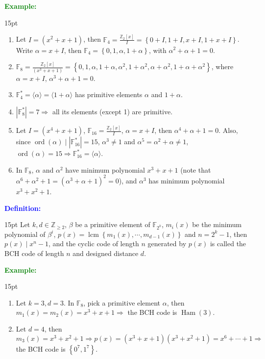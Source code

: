 \documentclass[12pt]{article}
\newcommand{\noparskip}{\vspace{-\parskip}}
\newenvironment{points}
	{\begin{enumerate}[label = (\arabic*)]}
	{\end{enumerate}}
\newenvironment{dent}
	{\begin{adjustwidth}{15pt}{}\noparskip}
	{\end{adjustwidth}}
\newenvironment{definition}
	{\textcolor{Blue}{\textbf{Definition:}}\begin{dent}}
	{\end{dent}}
\newenvironment{example}
	{\textcolor{Green}{\textbf{Example:}}\begin{dent}}
	{\end{dent}}
\renewcommand{\implies}{\Rightarrow}
\newcommand{\set}[1]{\left\{ #1 \right\}}
\newcommand{\sizeof}[1]{\left| #1 \right|}
\newcommand{\Z}{\mathbb{Z}}
\newcommand{\Ztwox}{\Z_2[x]}
\newcommand{\Ztwoxover}[1]{\frac{\Ztwox}{#1}}
\newcommand{\gen}[1]{\left( #1 \right)}
\newcommand{\Ztwoxgen}[1]{\frac{\Ztwox}{\gen{#1}}}
\newcommand{\field}[1]{\mathbb{F}_{#1}}
\newcommand{\cycgen}[1]{\langle #1 \rangle}
\newcommand{\Ham}[1]{\operatorname{Ham}(#1)}
\newcommand{\ord}[1]{\operatorname{ord}(#1)}
\newcommand{\lcm}[1]{\operatorname{lcm}\set{#1}}
\begin{document}
\begin{example}
\begin{points}
\item Let $I = \gen{x^2 + x + 1}$, then $\field{4} = \Ztwoxover{I} = \set{0 + I, 1 + I, x + I, 1 + x + I}$. Write $\alpha = x + I$, then $\field{4} = \set{0, 1, \alpha, 1 + \alpha}$, with $\alpha^2 + \alpha + 1 = 0$.
\item $\field{8} = \Ztwoxgen{x^3 + x + 1} = \set{0, 1, \alpha, 1 + \alpha, \alpha^2, 1 + \alpha^2, \alpha + \alpha^2, 1 + \alpha + \alpha^2}$, where $\alpha = x + I$, $\alpha^3 + \alpha + 1 = 0$.
\item $\field{4}^* = \cycgen{\alpha} = \cycgen{1 + \alpha}$ has primitive elements $\alpha$ and $1 + \alpha$.
\item $\sizeof{\field{8}^*} = 7 \implies$ all its elements (except 1) are primitive.
\item Let $I = \gen{x^4 + x + 1}$, $\field{16} = \Ztwoxover{I}$, $\alpha = x + I$, then $\alpha^4 + \alpha + 1 = 0$. Also, since $\ord{\alpha} \mid \sizeof{\field{16}^*} = 15$, $\alpha^3 \ne 1$ and $\alpha^5 = \alpha^2 + \alpha \ne 1$, $\ord{\alpha} = 15 \implies \field{16}^* = \cycgen{\alpha}$.
\item In $\field{8}$, $\alpha$ and $\alpha^2$ have minimum polynomial $x^3 + x + 1$ (note that $\alpha^6 + \alpha^2 + 1 = (\alpha^3 + \alpha + 1)^2 = 0$), and $\alpha^3$ has minimum polynomial $x^3 + x^2 + 1$.
\end{points}
\end{example}

\begin{definition}
Let $k, d \in \Z_{\ge 2}$, $\beta$ be a primitive element of $\field{2^k}$, $m_i(x)$ be the minimum polynomial of $\beta^i$, $p(x) = \lcm{m_1(x), \cdots, m_{d - 1}(x)}$ and $n = 2^k - 1$, then $p(x) \mid x^n - 1$, and the cyclic code of length $n$ generated by $p(x)$ is called the BCH code of length $n$ and designed distance $d$.
\end{definition}

\begin{example}
\begin{points}
\item Let $k = 3, d = 3$. In $\field{8}$, pick a primitive element $\alpha$, then $m_1(x) = m_2(x) = x^3 + x + 1 \implies$ the BCH code is $\Ham{3}$.
\item Let $d = 4$, then $m_3(x) = x^3 + x^2 + 1 \implies p(x) = (x^3 + x + 1)(x^3 + x^2 + 1) = x^6 + \cdots + 1 \implies$ the BCH code is $\set{0^7, 1^7}$.
\end{points}
\end{example}
\end{document}
